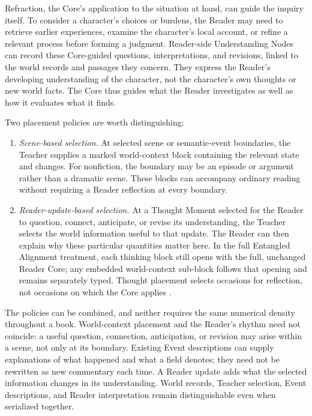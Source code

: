 \documentclass[10pt]{article}
\begin{document}
Refraction, the Core's application to the situation at hand, can guide the
inquiry itself. To consider a character's choices or
burdens, the Reader may need to retrieve earlier experiences, examine the
character's local account, or refine a relevant process before forming a
judgment. Reader-side Understanding Nodes can record these Core-guided
questions, interpretations, and revisions, linked to the world records and
passages they concern. They express the Reader's developing understanding of
the character, not the character's own thoughts or new world facts. The Core
thus guides what the Reader investigates as well as how it evaluates what it
finds.

Two placement policies are worth distinguishing:
\begin{enumerate}[leftmargin=1.6em,itemsep=2pt,topsep=3pt]
\item \emph{Scene-based selection.} At selected scene or semantic-event
boundaries, the Teacher supplies a marked world-context block containing the
relevant state and changes. For nonfiction, the boundary may be an episode or
argument rather than a dramatic scene. These blocks can accompany ordinary
reading without requiring a Reader reflection at every boundary.
\item \emph{Reader-update-based selection.} At a Thought Moment selected for
the Reader to question, connect, anticipate, or revise its understanding, the
Teacher selects the world information useful to that update. The Reader can
then explain why these particular quantities matter here. In the full
Entangled Alignment treatment, each thinking block still opens with the full,
unchanged Reader Core; any embedded world-context sub-block follows that
opening and remains separately typed. Thought placement selects occasions for
reflection, not occasions on which the Core applies
\cite{westerbergEntangled2026}.
\end{enumerate}
The policies can be combined, and neither requires the same numerical density
throughout a book. World-context placement and the Reader's rhythm need not
coincide: a useful question, connection, anticipation, or revision may arise
within a scene, not only at its boundary. Existing Event descriptions can supply explanations of
what happened and what a field denotes; they need not be rewritten as new
commentary each time. A Reader update adds what the selected information changes
in its understanding. World records, Teacher selection, Event descriptions,
and Reader interpretation remain distinguishable even when serialized together.
\end{document}
